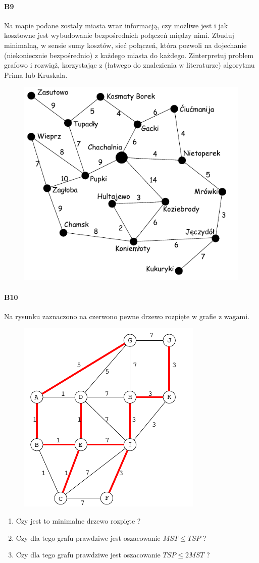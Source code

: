 \documentclass[a4paper,12pt]{article}
\theoremstyle{definition}%
\theoremstyle{definition}
\theoremstyle{problem}
\begin{document}
\paragraph{B9} Na mapie podane zostały miasta wraz informacją, czy możliwe jest i jak kosztowne jest wybudowanie bezpośrednich połączeń między nimi. Zbuduj minimalną, w sensie sumy kosztów, sieć połączeń, która pozwoli na dojechanie (niekoniecznie bezpośrednio) z każdego miasta do każdego. Zinterpretuj problem grafowo i rozwiąż, korzystając z (łatwego do znalezienia w literaturze) algorytmu Prima lub Kruskala.
\begin{figure}[H]
\centering
\includegraphics[width=.6\textwidth]{img/2_B9}
\end{figure}

\paragraph{B10} Na rysunku zaznaczono na czerwono pewne drzewo rozpięte w grafie z wagami.
\begin{figure}[H]
\centering
\includegraphics[width=.6\textwidth]{img/2_B10}
\end{figure}
\begin{enumerate}[label=\alph*)]
\item Czy jest to minimalne drzewo rozpięte ?
\item Czy dla tego grafu prawdziwe jest oszacowanie $MST\leq TSP$ ?
\item Czy dla tego grafu prawdziwe jest oszacowanie $TSP\leq 2MST$ ?
\end{enumerate}
\end{document}
